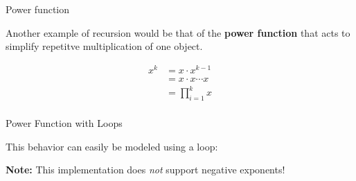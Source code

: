 \begin{frame}{Power function}

Another example of recursion would be that of the \textbf{power
function} that acts to simplify repetitve multiplication of one object.

\[\begin{aligned}
  {x^k} &= x \cdot {x^{k - 1} } \\
   &= x \cdot x \cdots x \\
   &= \prod\limits_{i = 1}^k x\\ 
\end{aligned} \]

\end{frame}

\begin{frame}[fragile]{Power Function with Loops}

This behavior can easily be modeled using a loop:

\begin{Shaded}
\begin{Highlighting}[]
\StringTok{ }
  
  \StringTok{ }               
  
    \StringTok{ }
  \NormalTok{\}}
  
\NormalTok{\}}
\end{Highlighting}
\end{Shaded}

\textbf{Note:} This implementation does \emph{not} support negative
exponents!

\end{frame}

